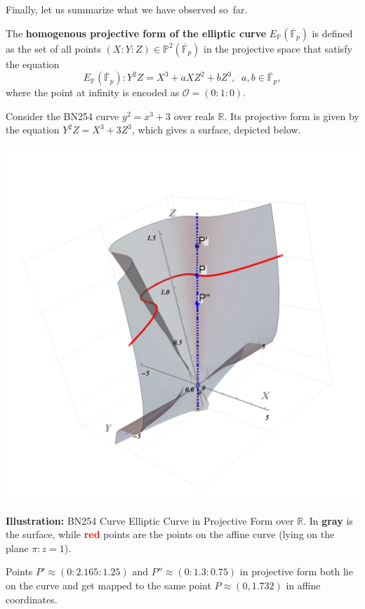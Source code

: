\documentclass[../lecture-notes.tex]{subfiles}
\begin{document}
Finally, let us summarize what we have observed so~far.

\vspace{-2mm}

\begin{definition}
    The \textbf{homogenous projective form of the elliptic curve} $E_{\mathbb{P}}(\overline{\mathbb{F}}_p)$ is defined as the set of all points $(X:Y:Z) \in \mathbb{P}^2(\overline{\mathbb{F}}_p)$ in the projective space that satisfy the equation
    \begin{equation*}
        E_{\mathbb{P}}(\overline{\mathbb{F}}_p): Y^2Z = X^3 + aXZ^2 + bZ^3, \;\; a,b \in \overline{\mathbb{F}}_p,
    \end{equation*}
    where the point at infinity is encoded as $\mathcal{O} = (0:1:0)$.
\end{definition}

\vspace{-6mm}

\begin{example}
    Consider the BN254 curve $y^2 = x^3 + 3$ over reals $\mathbb{R}$. Its projective form is given by the equation $Y^2Z = X^3 + 3Z^3$, which gives a surface, depicted below.
    
    \vspace{-5mm}
    
    \begin{center}
        \includegraphics[trim={275 100 225 100}, width=0.35\linewidth, clip]{images/lecture_4/projective_ec.pdf}

        \vspace{-1mm}
        
        \small{\textbf{Illustration:} BN254 Curve Elliptic Curve in Projective Form over $\mathbb{R}$. In \textcolor{black!80}{\textbf{gray}} is the surface, while \textcolor{red}{\textbf{red}} points are the points on the affine curve (lying on the plane $\pi: z=1$).}
    \end{center}

    Points $P'\approx (0:2.165:1.25)$ and $P'' \approx (0:1.3:0.75)$ in projective form both lie on the curve and get mapped to the same point $P \approx (0,1.732)$ in affine coordinates.
\end{example}
\end{document}
